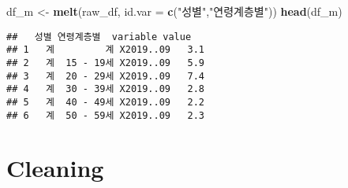 \documentclass[]{article}
\newenvironment{Shaded}{\begin{snugshade}}{\end{snugshade}}
\newcommand{\DataTypeTok}[1]{\textcolor[rgb]{0.13,0.29,0.53}{#1}}
\newcommand{\DecValTok}[1]{\textcolor[rgb]{0.00,0.00,0.81}{#1}}
\newcommand{\KeywordTok}[1]{\textcolor[rgb]{0.13,0.29,0.53}{\textbf{#1}}}
\newcommand{\NormalTok}[1]{#1}
\newcommand{\OperatorTok}[1]{\textcolor[rgb]{0.81,0.36,0.00}{\textbf{#1}}}
\newcommand{\StringTok}[1]{\textcolor[rgb]{0.31,0.60,0.02}{#1}}
\begin{document}
\begin{Shaded}
\begin{Highlighting}[]
\NormalTok{df_m <-}\StringTok{ }\KeywordTok{melt}\NormalTok{(raw_df, }\DataTypeTok{id.var =} \KeywordTok{c}\NormalTok{(}\StringTok{"성별"}\NormalTok{,}\StringTok{"연령계층별"}\NormalTok{))}
\KeywordTok{head}\NormalTok{(df_m)}
\end{Highlighting}
\end{Shaded}

\begin{verbatim}
##   성별 연령계층별  variable value
## 1   계         계 X2019..09   3.1
## 2   계  15 - 19세 X2019..09   5.9
## 3   계  20 - 29세 X2019..09   7.4
## 4   계  30 - 39세 X2019..09   2.8
## 5   계  40 - 49세 X2019..09   2.2
## 6   계  50 - 59세 X2019..09   2.3
\end{verbatim}

\hypertarget{cleaning}{%
\section{Cleaning}\label{cleaning}}

\begin{Shaded}
\end{Shaded}
\end{document}
